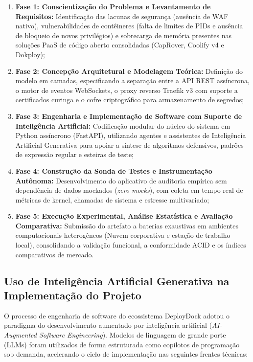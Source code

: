 \begin{enumerate}
    \item \textbf{Fase 1: Conscientização do Problema e Levantamento de Requisitos:} Identificação das lacunas de segurança (ausência de WAF nativo), vulnerabilidades de contêineres (falta de limites de PIDs e ausência de bloqueio de novos privilégios) e sobrecarga de memória presentes nas soluções PaaS de código aberto consolidadas (CapRover, Coolify v4 e Dokploy);
    \item \textbf{Fase 2: Concepção Arquitetural e Modelagem Teórica:} Definição do modelo em camadas, especificando a separação entre a API REST assíncrona, o motor de eventos WebSockets, o proxy reverso Traefik v3 com suporte a certificados curinga e o cofre criptográfico para armazenamento de segredos;
    \item \textbf{Fase 3: Engenharia e Implementação de Software com Suporte de Inteligência Artificial:} Codificação modular do núcleo do sistema em Python assíncrono (FastAPI), utilizando agentes e assistentes de Inteligência Artificial Generativa para apoiar a síntese de algoritmos defensivos, padrões de expressão regular e esteiras de teste;
    \item \textbf{Fase 4: Construção da Sonda de Testes e Instrumentação Autônoma:} Desenvolvimento do aplicativo de auditoria empírica sem dependência de dados mockados (\textit{zero mocks}), com coleta em tempo real de métricas de kernel, chamadas de sistema e estresse multivariado;
    \item \textbf{Fase 5: Execução Experimental, Análise Estatística e Avaliação Comparativa:} Submissão do artefato a baterias exaustivas em ambientes computacionais heterogêneos (Nuvem corporativa e estação de trabalho local), consolidando a validação funcional, a conformidade ACID e os índices comparativos de mercado.
\end{enumerate}

\subsection{Uso de Inteligência Artificial Generativa na Implementação do Projeto}
\label{sec:uso-ia-implementacao}

O processo de engenharia de software do ecossistema DeployDock adotou o paradigma do desenvolvimento aumentado por inteligência artificial (\textit{AI-Augmented Software Engineering}). Modelos de linguagem de grande porte (LLMs) foram utilizados de forma estruturada como copilotos de programação sob demanda, acelerando o ciclo de implementação nas seguintes frentes técnicas:

